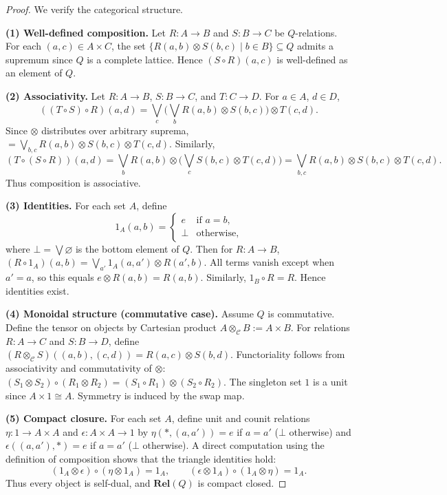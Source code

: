 \begin{proof}
	We verify the categorical structure.

	\medskip
	\noindent
	\textbf{(1) Well-defined composition.}
	Let $R:A \to B$ and $S:B \to C$ be $Q$-relations.
	For each $(a,c) \in A \times C$, the set
	$\{ R(a,b)\otimes S(b,c) \mid b \in B \} \subseteq Q$
	admits a supremum since $Q$ is a complete lattice.
	Hence $(S\circ R)(a,c)$ is well-defined as an element of $Q$.

	\medskip
	\noindent
	\textbf{(2) Associativity.}
	Let $R:A\to B$, $S:B\to C$, and $T:C\to D$.
	For $a\in A$, $d\in D$,
	\[
		((T\circ S)\circ R)(a,d)
		=
		\bigvee_{c}
		\Big(
		\bigvee_{b} R(a,b)\otimes S(b,c)
		\Big)
		\otimes T(c,d).
	\]
	Since $\otimes$ distributes over arbitrary suprema,
	$= \bigvee_{b,c} R(a,b)\otimes S(b,c)\otimes T(c,d)$.
	Similarly,
	\[
		(T\circ (S\circ R))(a,d)
		=
		\bigvee_{b}
		R(a,b)\otimes
		\Big(
		\bigvee_{c} S(b,c)\otimes T(c,d)
		\Big)
		=
		\bigvee_{b,c}
		R(a,b)\otimes S(b,c)\otimes T(c,d).
	\]
	Thus composition is associative.

	\medskip
	\noindent
	\textbf{(3) Identities.}
	For each set $A$, define
	\[
		1_A(a,b)
		=
		\begin{cases}
			e    & \text{if } a=b,   \\
			\bot & \text{otherwise},
		\end{cases}
	\]
	where $\bot = \bigvee \varnothing$ is the bottom element of $Q$.
	Then for $R:A\to B$,
	$(R\circ 1_A)(a,b) = \bigvee_{a'} 1_A(a,a')\otimes R(a',b)$.
	All terms vanish except when $a'=a$, so this equals $e \otimes R(a,b) = R(a,b)$.
	Similarly, $1_B\circ R = R$. Hence identities exist.

	\medskip
	\noindent
	\textbf{(4) Monoidal structure (commutative case).}
	Assume $Q$ is commutative.
	Define the tensor on objects by Cartesian product $A\otimes_{\mathcal{C}} B := A\times B$.
	For relations $R:A\to C$ and $S:B\to D$, define
	$(R\otimes_{\mathcal{C}} S)((a,b),(c,d)) = R(a,c)\otimes S(b,d)$.
	Functoriality follows from associativity and commutativity of $\otimes$:
	$(S_1\otimes S_2)\circ (R_1\otimes R_2) = (S_1\circ R_1)\otimes (S_2\circ R_2)$.
	The singleton set $1$ is a unit since $A\times 1 \cong A$.
	Symmetry is induced by the swap map.

	\medskip
	\noindent
	\textbf{(5) Compact closure.}
	For each set $A$, define unit and counit relations
	$\eta : 1 \to A\times A$ and $\epsilon : A\times A \to 1$
	by $\eta(*,(a,a')) = e$ if $a=a'$ ($\bot$ otherwise) and
	$\epsilon((a,a'),*) = e$ if $a=a'$ ($\bot$ otherwise).
	A direct computation using the definition of composition shows that the
	triangle identities hold:
	\[
		(1_A\otimes \epsilon)\circ (\eta\otimes 1_A) = 1_A,
		\qquad
		(\epsilon\otimes 1_A)\circ (1_A\otimes \eta) = 1_A.
	\]
	Thus every object is self-dual, and $\mathbf{Rel}(Q)$ is compact closed.
\end{proof}

